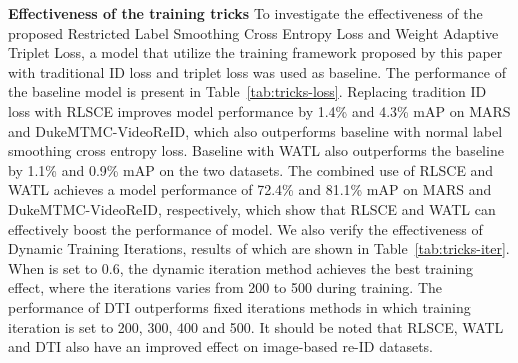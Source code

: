 \documentclass[10pt,twocolumn,letterpaper]{article}
\begin{document}
\noindent \textbf{Effectiveness of the training tricks}
To investigate the effectiveness of the proposed Restricted Label Smoothing Cross Entropy Loss and Weight Adaptive Triplet Loss, a model that utilize the training framework proposed by this paper with traditional ID loss and triplet loss was used as baseline. The performance of the baseline model is present in Table~\ref{tab:tricks-loss}. Replacing tradition ID loss with RLSCE improves model performance by 1.4\% and 4.3\% mAP on MARS and DukeMTMC-VideoReID, which also outperforms baseline with normal label smoothing cross entropy loss. Baseline with WATL also outperforms the baseline by 1.1\% and 0.9\% mAP on the two datasets. The combined use of RLSCE and WATL achieves a model performance of 72.4\% and 81.1\% mAP on MARS and DukeMTMC-VideoReID, respectively, which show that RLSCE and WATL can effectively boost the performance of model. We also verify the effectiveness of Dynamic Training Iterations, results of which are shown in Table~\ref{tab:tricks-iter}. When  is set to 0.6, the dynamic iteration method achieves the best training effect, where the iterations varies from 200 to 500 during training. The performance of DTI outperforms fixed iterations methods in which training iteration is set to 200, 300, 400 and 500. It should be noted that RLSCE, WATL and DTI also have an improved effect on image-based re-ID datasets.

\begin{table}[]
\begin{threeparttable}
\begin{center}
\caption{Ablation studies on Restricted Label Smoothing Cross Entropy Loss and Weight Adaptive Triplet Loss. ``Baseline'' means the training framework proposed by this paper with traditional ID loss and triplet loss.}
\label{tab:tricks-loss}
\end{center}
\end{threeparttable}
\end{table}
\end{document}
